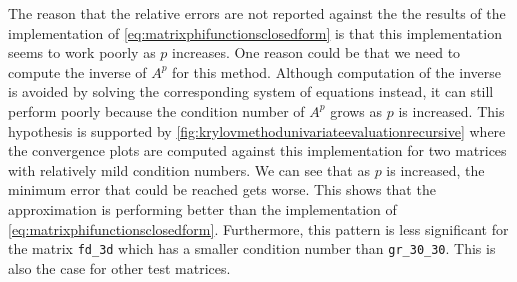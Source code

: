 \begin{remark}
    The reason that the relative errors are not reported against the the results of the implementation of
    \autoref{eq:matrixphifunctionsclosedform} is that this implementation seems to work poorly as $p$ increases.
    One reason could be that we need to compute the inverse of $A^p$ for this method. Although computation of the
    inverse is avoided by solving the corresponding system of equations instead, it can still perform poorly because
    the condition number of $A^p$ grows as $p$ is increased. This hypothesis is supported by
    \autoref{fig:krylovmethodunivariateevaluationrecursive} where the convergence plots are computed against this implementation
    for two matrices with relatively mild condition numbers. We can see that as $p$ is increased, the minimum error that could be
    reached gets worse. This shows that the approximation is performing better than the implementation of
    \autoref{eq:matrixphifunctionsclosedform}.
    Furthermore, this pattern is less significant for the matrix \texttt{fd\_3d} which has a smaller condition number
    than \texttt{gr\_30\_30}. This is also the case for other test matrices.
\end{remark}

